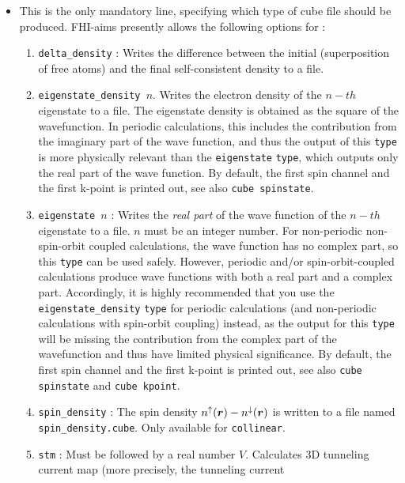 \begin{itemize}
\item {}  
This is the only mandatory line, specifying which type of cube file should be produced.
FHI-aims presently allows the following options for :
\begin{enumerate}
  \item \texttt{delta\_density} : Writes the difference between the
    initial (superposition of free atoms) and the final
    self-consistent density to a file.
  \item \texttt{eigenstate\_density $n$}. Writes the electron density of the
    $n-th$ eigenstate to a file.  The eigenstate density is obtained as the
    square of the wavefunction.  In periodic calculations, this includes the
    contribution from the imaginary part of the wave function, and thus the
    output of this \texttt{type} is more physically relevant than the
    \texttt{eigenstate} \texttt{type}, which outputs only the real part of the
    wave function.  By default, the first spin channel and the first k-point
    is printed out, see also \texttt{cube spinstate}.
  \item \texttt{eigenstate $n$} :  Writes the \emph{real part} of the wave function
    of the $n-th$ eigenstate to a file.  $n$ must be an integer number. For
    non-periodic non-spin-orbit coupled calculations, the wave function has
    no complex part, so this \texttt{type} can be used safely.  However, periodic
    and/or spin-orbit-coupled calculations produce wave functions with both a real
    part and a complex part.  Accordingly, it is highly recommended that you use the
    \texttt{eigenstate\_density} \texttt{type} for periodic calculations (and non-periodic
    calculations with spin-orbit coupling) instead, as the output for this \texttt{type}
    will be missing the contribution from the complex part of the wavefunction and
    thus have limited physical significance.  By default, the first spin channel
    and the first k-point is printed out, see also \texttt{cube spinstate} and
    \texttt{cube kpoint}.
  \item \texttt{spin\_density} : The spin density $n^\uparrow(\mbox{\boldmath$r$})
    - n^\downarrow(\mbox{\boldmath$r$})$ is written to a file named
    \texttt{spin\_density.cube}. Only available for 
    \texttt{collinear}.
  \item \texttt{stm} :
    Must be followed by a real number $V$. Calculates
    3D tunneling current map (more precisely, the tunneling current

\end{enumerate}
\end{itemize}
